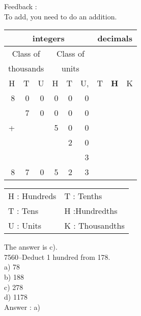 \documentclass[letterpaper, 12pt]{article}
\begin{document}
Feedback :\\
To add, you need to do an addition.
\begin{center}
\begin{tabular}{|rrr|rrr|rrr|}
\hline
\multicolumn{6}{|c|}{integers} &\multicolumn{3}{|c|}{decimals} \\
\hline
\multicolumn{3}{|c|}{Class of} &\multicolumn{3}{|c|}{Class of} &  \multicolumn{3}{c|}{} \\
\multicolumn{3}{|c|}{thousands} &\multicolumn{3}{|c|}{units} &  \multicolumn{3}{c|}{} \\
\hline
H & T & U &H & T & U, & T\up{th} & \textbf{H\up{th}} & K\up{th} \\
\hline
\hline
8 & 0 & 0 & 0 & 0 & 0 &  & &\\
 & 7 & 0 & 0 & 0 & 0 &  & &\\
+ &  &  & 5 & 0 & 0 &  & &\\
 &  &  &  & 2 & 0 &  & &\\
 &  &  &  &  & 3 &  & &\\
\hline
\hline
 8 & 7 & 0 & 5 & 2 & 3 &  & &
\\
\hline
\end{tabular}
\end{center}

\scriptsize
\begin{center}
\begin{tabular}{ll}
H : Hundreds & T\up{th} : Tenths\\
T : Tens & H\up{th} :Hundredths\\
U : Units & K\up{e} : Thousandths\\
\end{tabular}
\end{center}

\normalsize
The answer is c).\\






7560--Deduct 1 hundred from 178.\\

a) 78\\
b) 188\\
c) 278\\
d) 1178\\

Answer : a)\\
\end{document}
